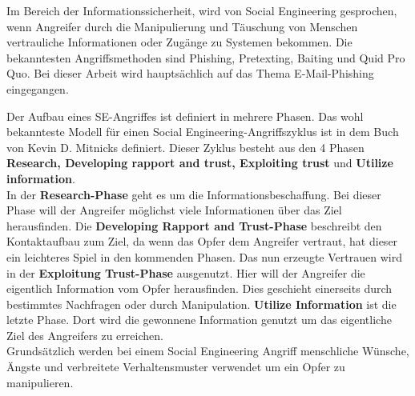 	Im Bereich der Informationssicherheit, wird von Social Engineering gesprochen, wenn Angreifer durch die Manipulierung und Täuschung von Menschen vertrauliche Informationen oder Zugänge zu Systemen bekommen. Die bekanntesten Angriffsmethoden sind Phishing, Pretexting, Baiting und Quid Pro Quo. Bei dieser Arbeit wird hauptsächlich auf das Thema E-Mail-Phishing eingegangen.

	Der Aufbau eines SE-Angriffes ist definiert in mehrere Phasen. Das wohl bekannteste Modell für einen Social Engineering-Angriffszyklus ist in dem Buch von Kevin D. Mitnicks \cite{ArtOfDeception} definiert. Dieser Zyklus besteht aus den 4 Phasen \textbf{Research, Developing rapport and trust, Exploiting trust} und \textbf{Utilize information}.\\
	In der \textbf{Research-Phase} geht es um die Informationsbeschaffung. Bei dieser Phase will der Angreifer möglichst viele Informationen über das Ziel herausfinden. Die \textbf{Developing Rapport and Trust-Phase} beschreibt den Kontaktaufbau zum Ziel, da wenn das Opfer dem Angreifer vertraut, hat dieser ein leichteres Spiel in den kommenden Phasen. Das nun erzeugte Vertrauen wird in der \textbf{Exploitung Trust-Phase} ausgenutzt. Hier will der Angreifer die eigentlich Information vom Opfer herausfinden. Dies geschieht einerseits durch bestimmtes Nachfragen oder durch Manipulation.
	\textbf{Utilize Information} ist die letzte Phase. Dort wird die gewonnene Information genutzt um das eigentliche Ziel des Angreifers zu erreichen.\\
	Grundsätzlich werden bei einem Social Engineering Angriff menschliche Wünsche, Ängste und verbreitete Verhaltensmuster verwendet um ein Opfer zu manipulieren.\cite{LeitfadenSE}\\

